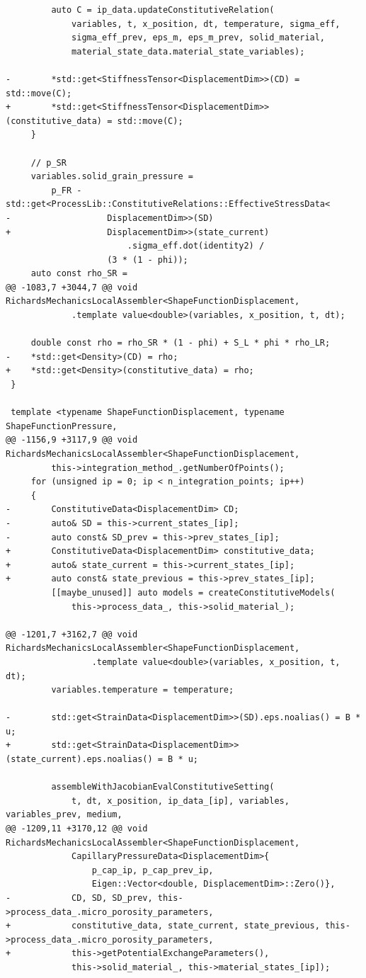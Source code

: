 \documentclass[10pt]{article}
\begin{document}
\begin{lstlisting}
         auto C = ip_data.updateConstitutiveRelation(
             variables, t, x_position, dt, temperature, sigma_eff,
             sigma_eff_prev, eps_m, eps_m_prev, solid_material,
             material_state_data.material_state_variables);
 
-        *std::get<StiffnessTensor<DisplacementDim>>(CD) = std::move(C);
+        *std::get<StiffnessTensor<DisplacementDim>>(constitutive_data) = std::move(C);
     }
 
     // p_SR
     variables.solid_grain_pressure =
         p_FR - std::get<ProcessLib::ConstitutiveRelations::EffectiveStressData<
-                   DisplacementDim>>(SD)
+                   DisplacementDim>>(state_current)
                        .sigma_eff.dot(identity2) /
                    (3 * (1 - phi));
     auto const rho_SR =
@@ -1083,7 +3044,7 @@ void RichardsMechanicsLocalAssembler<ShapeFunctionDisplacement,
             .template value<double>(variables, x_position, t, dt);
 
     double const rho = rho_SR * (1 - phi) + S_L * phi * rho_LR;
-    *std::get<Density>(CD) = rho;
+    *std::get<Density>(constitutive_data) = rho;
 }
 
 template <typename ShapeFunctionDisplacement, typename ShapeFunctionPressure,
@@ -1156,9 +3117,9 @@ void RichardsMechanicsLocalAssembler<ShapeFunctionDisplacement,
         this->integration_method_.getNumberOfPoints();
     for (unsigned ip = 0; ip < n_integration_points; ip++)
     {
-        ConstitutiveData<DisplacementDim> CD;
-        auto& SD = this->current_states_[ip];
-        auto const& SD_prev = this->prev_states_[ip];
+        ConstitutiveData<DisplacementDim> constitutive_data;
+        auto& state_current = this->current_states_[ip];
+        auto const& state_previous = this->prev_states_[ip];
         [[maybe_unused]] auto models = createConstitutiveModels(
             this->process_data_, this->solid_material_);
 
@@ -1201,7 +3162,7 @@ void RichardsMechanicsLocalAssembler<ShapeFunctionDisplacement,
                 .template value<double>(variables, x_position, t, dt);
         variables.temperature = temperature;
 
-        std::get<StrainData<DisplacementDim>>(SD).eps.noalias() = B * u;
+        std::get<StrainData<DisplacementDim>>(state_current).eps.noalias() = B * u;
 
         assembleWithJacobianEvalConstitutiveSetting(
             t, dt, x_position, ip_data_[ip], variables, variables_prev, medium,
@@ -1209,11 +3170,12 @@ void RichardsMechanicsLocalAssembler<ShapeFunctionDisplacement,
             CapillaryPressureData<DisplacementDim>{
                 p_cap_ip, p_cap_prev_ip,
                 Eigen::Vector<double, DisplacementDim>::Zero()},
-            CD, SD, SD_prev, this->process_data_.micro_porosity_parameters,
+            constitutive_data, state_current, state_previous, this->process_data_.micro_porosity_parameters,
+            this->getPotentialExchangeParameters(),
             this->solid_material_, this->material_states_[ip]);
 

\end{lstlisting}
\end{document}
